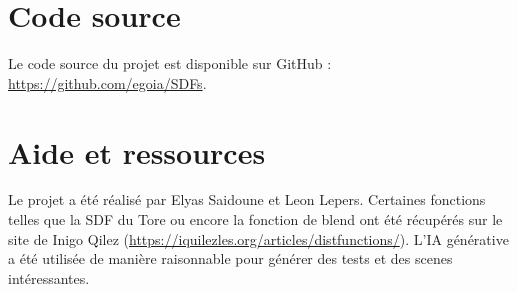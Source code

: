 \documentclass[11pt,a4paper]{article}
\begin{document}
\appendix
\section{Code source}
Le code source du projet est disponible sur GitHub : \url{https://github.com/egoia/SDFs}.

\section{Aide et ressources}
Le projet a été réalisé par Elyas Saidoune et Leon Lepers. Certaines fonctions telles que la SDF du Tore ou encore la fonction de blend ont été récupérés sur le site de Inigo Qilez (\url{https://iquilezles.org/articles/distfunctions/}).
L'IA générative a été utilisée de manière raisonnable pour générer des tests et des scenes intéressantes.
\end{document}
